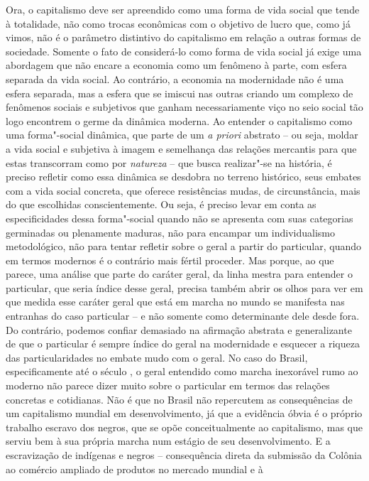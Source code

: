 Ora, o capitalismo deve ser apreendido como uma forma de vida social que
tende à totalidade, não como trocas econômicas com o objetivo de lucro
que, como já vimos, não é o parâmetro distintivo do capitalismo em
relação a outras formas de sociedade. Somente o fato de considerá-lo
como forma de vida social já exige uma abordagem que não encare a
economia como um fenômeno à parte, com esfera separada da vida social.
Ao contrário, a economia na modernidade não é uma esfera separada, mas a
esfera que se imiscui nas outras criando um complexo de fenômenos
sociais e subjetivos que ganham necessariamente viço no seio social tão
logo encontrem o germe da dinâmica moderna. Ao entender o capitalismo
como uma forma"-social dinâmica, que parte de um \emph{a priori} abstrato
-- ou seja, moldar a vida social e subjetiva à imagem e semelhança das
relações mercantis para que estas transcorram como por \emph{natureza}
-- que busca realizar"-se na história, é preciso refletir como essa
dinâmica se desdobra no terreno histórico, seus embates com a vida
social concreta, que oferece resistências mudas, de circunstância, mais
do que escolhidas conscientemente. Ou seja, é preciso levar em conta as
especificidades dessa forma"-social quando não se apresenta com suas
categorias germinadas ou plenamente maduras, não para encampar um
individualismo metodológico, não para tentar refletir sobre o geral a
partir do particular, quando em termos modernos é o contrário mais
fértil proceder. Mas porque, ao que parece, uma análise que parte do
caráter geral, da linha mestra para entender o particular, que seria
índice desse geral, precisa também abrir os olhos para ver em que medida
esse caráter geral que está em marcha no mundo se manifesta nas
entranhas do caso particular -- e não somente como determinante dele
desde fora. Do contrário, podemos confiar demasiado na afirmação
abstrata e generalizante de que o particular é sempre índice do geral na
modernidade e esquecer a riqueza das particularidades no embate mudo com
o geral. No caso do Brasil, especificamente até o século , o geral
entendido como marcha inexorável rumo ao moderno não parece dizer muito
sobre o particular em termos das relações concretas e cotidianas. Não é
que no Brasil não repercutem as consequências de um capitalismo mundial
em desenvolvimento, já que a evidência óbvia é o próprio trabalho
escravo dos negros, que se opõe conceitualmente ao capitalismo, mas que
serviu bem à sua própria marcha num estágio de seu desenvolvimento. E a
escravização de indígenas e negros -- consequência direta da submissão
da Colônia ao comércio ampliado de produtos no mercado mundial e à
